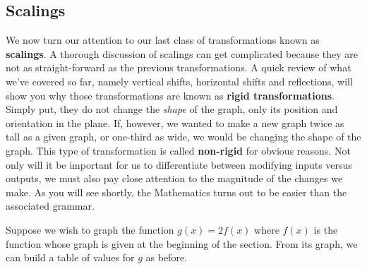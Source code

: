 \subsection{Scalings}

{}\pp

We now turn our attention to our last class of transformations known as \textbf{scalings}.  A thorough discussion of scalings can get complicated because they are not as straight-forward as the previous transformations.  A quick review of what we've covered so far, namely vertical shifts, horizontal shifts and reflections, will show you why those transformations are known as \textbf{rigid transformations}.  Simply put, they do not change the \emph{shape} of the graph, only its position and orientation in the plane.  If, however, we wanted to make a new graph twice as tall as a given graph, or one-third as wide, we would be changing the shape of the graph. This type of transformation is called \textbf{non-rigid} for obvious reasons.  Not only will it be important for us to differentiate between modifying inputs versus outputs, we must also pay close attention to the magnitude of the changes we make.  As you will see shortly, the Mathematics turns out to be easier than the associated grammar.

\smallskip

Suppose we wish to graph the function $g(x) =2 f(x)$ where $f(x)$ is the function whose graph is given at the beginning of the section. From its graph, we can build a table of values for $g$ as before.

